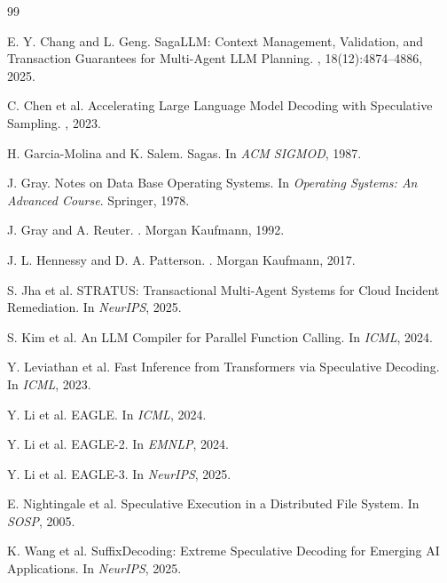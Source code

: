 \begin{thebibliography}{99}

E. Y. Chang and L. Geng.
\newblock SagaLLM: Context Management, Validation, and Transaction Guarantees for Multi-Agent LLM Planning.
, 18(12):4874--4886, 2025.

C. Chen et al.
\newblock Accelerating Large Language Model Decoding with Speculative Sampling.
, 2023.

H. Garcia-Molina and K. Salem.
\newblock Sagas.
\newblock In {\em ACM SIGMOD}, 1987.

J. Gray.
\newblock Notes on Data Base Operating Systems.
\newblock In {\em Operating Systems: An Advanced Course}. Springer, 1978.

J. Gray and A. Reuter.
.
\newblock Morgan Kaufmann, 1992.

J. L. Hennessy and D. A. Patterson.
.
\newblock Morgan Kaufmann, 2017.

S. Jha et al.
\newblock STRATUS: Transactional Multi-Agent Systems for Cloud Incident Remediation.
\newblock In {\em NeurIPS}, 2025.

S. Kim et al.
\newblock An LLM Compiler for Parallel Function Calling.
\newblock In {\em ICML}, 2024.

Y. Leviathan et al.
\newblock Fast Inference from Transformers via Speculative Decoding.
\newblock In {\em ICML}, 2023.

Y. Li et al.
\newblock EAGLE.
\newblock In {\em ICML}, 2024.

Y. Li et al.
\newblock EAGLE-2.
\newblock In {\em EMNLP}, 2024.

Y. Li et al.
\newblock EAGLE-3.
\newblock In {\em NeurIPS}, 2025.

E. Nightingale et al.
\newblock Speculative Execution in a Distributed File System.
\newblock In {\em SOSP}, 2005.

K. Wang et al.
\newblock SuffixDecoding: Extreme Speculative Decoding for Emerging AI Applications.
\newblock In {\em NeurIPS}, 2025.



\end{thebibliography}
